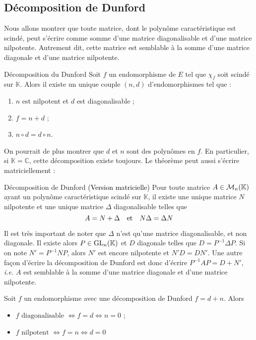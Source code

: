 \subsection{Décomposition de Dunford}

    Nous allons montrer que toute matrice, dont le polynôme caractéristique est scindé, peut s’écrire comme somme d’une matrice diagonalisable et d’une matrice nilpotente. Autrement dit, cette matrice est semblable à la somme d’une matrice diagonale et d’une matrice nilpotente.

    \begin{theo}{Décomposition du Dunford}{}
        Soit $f$ un endomorphisme de $E$ tel que $\chi_f$ soit scindé sur $\mathbb{K}$. Alors il existe un unique couple $(n,d)$ d’endomorphismes tel que :
        \begin{enumerate}
            \item $n$ est nilpotent et $d$ est diagonalisable ;
            \item $f = n + d$ ;
            \item $n \circ d = d \circ n$.
        \end{enumerate}
    \end{theo}

    On pourrait de plus montrer que $d$ et $n$ sont des polynômes en $f$. En particulier, si $\mathbb{K} = \mathbb{C}$, cette décomposition existe toujours. Le théorème peut aussi s’écrire matriciellement : 

    \begin{theo}{Décomposition de Dunford \textcolor{black}{(Version matricielle)}}{}
        Pour toute matrice $A \in \mathcal{M}_{n}(\mathbb{K})$ ayant un polynôme caractéristique scindé sur $\mathbb{K}$, il existe une unique matrice $N$ nilpotente et une unique matrice $\Delta$ diagonalisable telles que 
        \[ A = N + \Delta \quad \text{et} \quad N \Delta = \Delta N \]     
    \end{theo}

    Il est très important de noter que $\Delta$ n’est qu’une matrice diagonalisable, et non diagonale. Il existe alors $P \in \operatorname{GL}_n(\mathbb{K})$ et $D$ diagonale telles que $D = P^{-1} \Delta P$. Si on note $N' = P^{-1} N P$, alors $N'$ est encore nilpotente et $N' D = D N'$. Une autre façon d’écrire la décomposition de Dunford est donc d’écrire $P^{-1} A P = D + N'$, \textit{i.e.} $A$ est semblable à la somme d’une matrice diagonale et d’une matrice nilpotente.

    \begin{coro}{}{}
        Soit $f$ un endomorphisme avec une décomposition de Dunford $f = d + n$. Alors 
        \begin{itemize}
            \item $f \text{ diagonalisable } \iff f = d \iff n = 0$ ;
            \item $f \text{ nilpotent } \iff  f = n \iff d = 0$
        \end{itemize}
    \end{coro}

